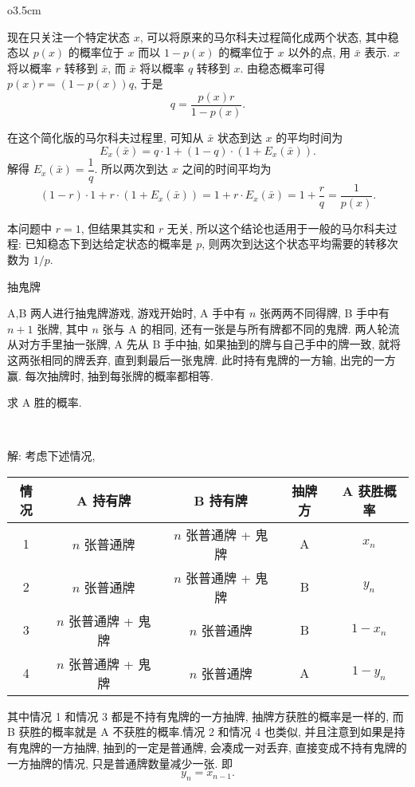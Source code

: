 \begin{wrapfigure}{o}{3.5cm}
\vspace{-1em}
\end{wrapfigure}
\mbox{}
现在只关注一个特定状态 $ x $, 可以将原来的马尔科夫过程简化成两个状态, 其中稳态以 $ p(x) $ 的概率位于 $ x $ 而以 $ 1 - p(x) $ 的概率位于 $ x $ 以外的点, 用 $ \bar{x} $ 表示. $ x $ 将以概率 $ r $ 转移到 $ \bar{x} $, 而 $ \bar{x} $ 将以概率 $ q $ 转移到 $ x $. 由稳态概率可得 $ p(x) r = (1-p(x))q $, 于是 
\[ q = \frac{p(x)r}{1-p(x)}. \]

在这个简化版的马尔科夫过程里, 可知从 $ \bar{x} $ 状态到达 $ x $ 的平均时间为 
\[ E_x(\bar{x}) = q\cdot 1 + (1-q)\cdot (1+E_x(\bar{x})). \]
解得 $ E_x(\bar{x}) = \dfrac{1}{q}.$ 所以两次到达 $ x $ 之间的时间平均为 
\[ (1-r)\cdot 1 + r\cdot (1+E_x(\bar{x})) = 1 + r\cdot E_x(\bar{x}) = 1 + \frac{r}{q} = \dfrac{1}{p(x)} .\]

本问题中 $ r = 1 $, 但结果其实和 $ r $ 无关, 所以这个结论也适用于一般的马尔科夫过程: 已知稳态下到达给定状态的概率是 $ p $, 则两次到达这个状态平均需要的转移次数为 $ 1/p $.


\newpage

\noindent 抽鬼牌

A,B 两人进行抽鬼牌游戏, 游戏开始时, A 手中有 $n$ 张两两不同得牌, B 手中有 $n+1$ 张牌, 其中 $n$ 张与 A 的相同, 还有一张是与所有牌都不同的鬼牌. 两人轮流从对方手里抽一张牌, A 先从 B 手中抽, 如果抽到的牌与自己手中的牌一致, 就将这两张相同的牌丢弃, 直到剩最后一张鬼牌. 此时持有鬼牌的一方输, 出完的一方赢. 每次抽牌时, 抽到每张牌的概率都相等.

求 A 胜的概率.

~

解: 考虑下述情况, 
\begin{figure*}[htbp]
\centering
\setlength\extrarowheight{3pt}
\begin{tabular}{|c|c|c|c|c|}
\hline
情况 & A 持有牌  & B 持有牌  &  抽牌方 & A 获胜概率    \\ \hline
1 & $n$ 张普通牌 & $n$ 张普通牌 + 鬼牌 & A & $x_n$  \\ \hline
2 & $n$ 张普通牌 & $n$ 张普通牌 + 鬼牌 & B & $y_n$  \\ \hline
3 & $n$ 张普通牌 + 鬼牌 & $n$ 张普通牌 & B & $1-x_n$  \\ \hline
4 & $n$ 张普通牌 + 鬼牌 & $n$ 张普通牌 & A & $1-y_n$  \\ \hline
\end{tabular}
\end{figure*}
其中情况 1 和情况 3 都是不持有鬼牌的一方抽牌, 抽牌方获胜的概率是一样的, 而 B 获胜的概率就是 A 不获胜的概率.情况 2 和情况 4 也类似, 并且注意到如果是持有鬼牌的一方抽牌, 抽到的一定是普通牌, 会凑成一对丢弃, 直接变成不持有鬼牌的一方抽牌的情况, 只是普通牌数量减少一张. 即
\[y_n = x_{n-1} .\]

